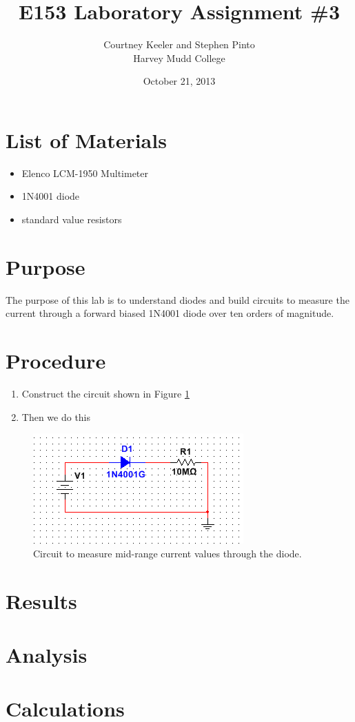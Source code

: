 \documentclass[12pt,letterpaper]{report}
\newlength \figwidth
\begin{document}
\title{E153 Laboratory Assignment \#3}
\author{Courtney Keeler and Stephen Pinto\\
Harvey Mudd College}
\date{October 21, 2013}
\maketitle

\section*{List of Materials}
\begin{itemize}
	\item Elenco LCM-1950 Multimeter
	\item 1N4001 diode
	\item standard value resistors
\end{itemize}

\section*{Purpose}
The purpose of this lab is to understand diodes and build circuits to measure the current through  a forward biased 1N4001 diode over ten orders of magnitude.

\section*{Procedure}

\begin{enumerate}
\item Construct the circuit shown in Figure \ref{fig:circuit_1}
\item Then we do this
\end{enumerate}

\begin{figure}
\centering
\includegraphics[width=\figwidth, keepaspectratio=true]{lab3/lab3_image_1.png}
\caption{Circuit to measure mid-range current values through the diode.}
\label{fig:circuit_1}
\end{figure}

\section*{Results}

\section*{Analysis}

\section*{Calculations}
\end{document}
